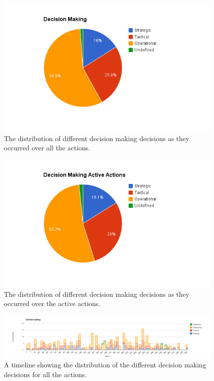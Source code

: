 \begin{figure}[!h]
	\centering
	\includegraphics[width=\textwidth, keepaspectratio]{figures/decision-p.png}
	\caption{The distribution of different decision making decisions as they occurred over all the actions.}
	\label{figure:decision-p}
\end{figure}

\begin{figure}[!h]
	\centering
	\includegraphics[width=\textwidth, keepaspectratio]{figures/decision-pa.png}
	\caption{The distribution of different decision making decisions as they occurred over the active actions.}
	\label{figure:decision-pa}
\end{figure}

\begin{figure}
	\centering
	\includegraphics[width=\textwidth, keepaspectratio]{figures/decision-l.png}
	\caption{A timeline showing the distribution of the different decision making decisions for all the actions.}
	\label{figure:decision-la}
\end{figure}

